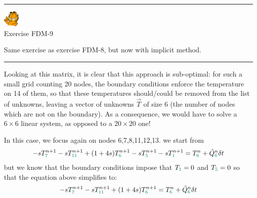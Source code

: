 \begin{center}
\begin{minipage}[t]{0.77\textwidth}
\par\noindent\rule{\textwidth}{0.4pt}
\begin{center}
\includegraphics[width=0.8cm]{images/garftr} \\
{\color{orange}Exercise FDM-9}
\end{center}

Same exercise as exercise FDM-8, but now with implicit method.

\par\noindent\rule{\textwidth}{0.4pt}
\end{minipage}
\end{center}


Looking at this matrix, it is clear that this approach is sub-optimal: for such a small grid counting
20 nodes, the boundary conditions enforce the temperature on 14 of them, so that these
temperatures should/could be removed from the list of unknowns, leaving a vector 
of unknowns $\vec{T}$ of size 6 (the number of nodes which are not on the boundary).
As a consequence, we would have to solve a $6\times 6$ linear system, as opposed to a $20\times 20$ one!

In this case, we focus again on nodes 6,7,8,11,12,13.
we start from 
\begin{equation}
-s T_{{\color{teal} 7}}^{n+1}
-s T_{{\color{teal} 11}}^{n+1} 
+(1+4s)T_{{\color{teal} 6}}^{n+1} 
-s T_{{\color{teal} 5}}^{n+1} 
-s T_{{\color{teal} 1}}^{n+1} 
= T_{{\color{teal} 6}}^n 
+\tilde{Q}_{{\color{teal} 6}}^n \delta t
\end{equation}
but we know that the boundary conditions impose that $T_{\color{teal}1}=0$ 
and $T_{\color{teal}5}=0$ so that the equation above simplifies to:
\begin{equation}
-s T_{{\color{teal} 7}}^{n+1}
-s T_{{\color{teal} 11}}^{n+1} 
+(1+4s)T_{{\color{teal} 6}}^{n+1} 
= T_{{\color{teal} 6}}^n 
+\tilde{Q}_{{\color{teal} 6}}^n\delta t
\end{equation}

